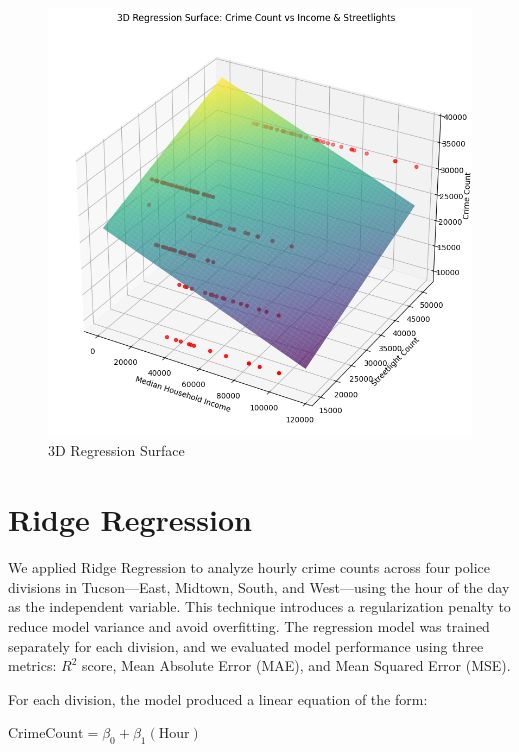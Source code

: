 \documentclass{report}
\begin{document}
    \begin{figure}[ht]
   	\begin{center}
   		\advance\leftskip-3cm
   		\advance\rightskip-3cm
   		\includegraphics[keepaspectratio=true,scale=.5]{3d-cover}
   		\caption{3D Regression Surface}
   		\label{fig:crime-type-by-time}
   	\end{center}
   \end{figure}

    
   \newpage
    \section{Ridge Regression}
    \par We applied Ridge Regression to analyze hourly crime counts across four police divisions in Tucson—East, Midtown, South, and West—using the hour of the day as the independent variable. This technique introduces a regularization penalty to reduce model variance and avoid overfitting. The regression model was trained separately for each division, and we evaluated model performance using three metrics: $R^2$ score, Mean Absolute Error (MAE), and Mean Squared Error (MSE).
    
    For each division, the model produced a linear equation of the form:
    
    \begin{center}
      \begin{math}
    	\text{CrimeCount} = \beta_0 + \beta_1(\text{Hour})
      \end{math}
    \end{center}
\end{document}
